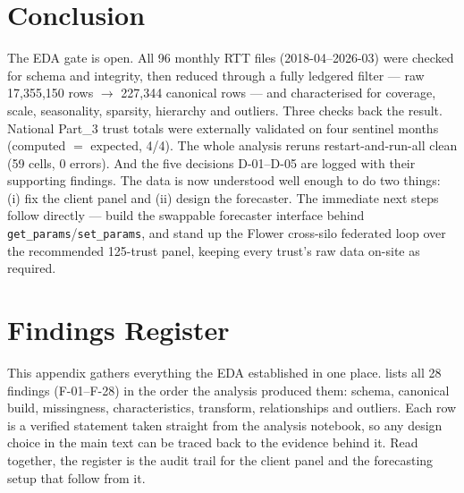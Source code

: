 \documentclass[11pt,a4paper]{article}
\begin{document}
\section{Conclusion}\label{sec:conclusion}
The EDA gate is open. All 96 monthly RTT files (2018-04--2026-03) were checked for schema and integrity, then reduced through a fully ledgered filter --- raw 17{,}355{,}150 rows $\rightarrow$ 227{,}344 canonical rows --- and characterised for coverage, scale, seasonality, sparsity, hierarchy and outliers. Three checks back the result. National Part\_3 trust totals were externally validated on four sentinel months (computed $=$ expected, 4/4). The whole analysis reruns restart-and-run-all clean (59 cells, 0 errors). And the five decisions D-01--D-05 are logged with their supporting findings. The data is now understood well enough to do two things: (i) fix the client panel and (ii) design the forecaster. The immediate next steps follow directly --- build the swappable forecaster interface behind \texttt{get\_params}/\texttt{set\_params}, and stand up the Flower cross-silo federated loop over the recommended 125-trust panel, keeping every trust's raw data on-site as required.

\appendix
\section{Findings Register}\label{sec:findings}
This appendix gathers everything the EDA established in one place.  lists all 28 findings (F-01--F-28) in the order the analysis produced them: schema, canonical build, missingness, characteristics, transform, relationships and outliers. Each row is a verified statement taken straight from the analysis notebook, so any design choice in the main text can be traced back to the evidence behind it. Read together, the register is the audit trail for the client panel and the forecasting setup that follow from it.
\end{document}
